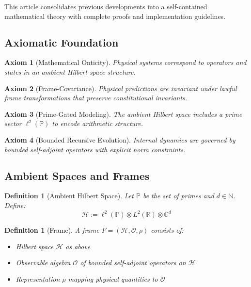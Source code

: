 \documentclass[10pt]{article}
\newtheorem{axiom}{Axiom}
\newtheorem{definition}[theorem]{Definition}
\newcommand{\PP}{\mathbb{P}}
\newcommand{\RR}{\mathbb{R}}
\newcommand{\CC}{\mathbb{C}}
\newcommand{\HH}{\mathcal{H}}
\begin{document}
This article consolidates previous developments into a self-contained mathematical theory with complete proofs and implementation guidelines.

\subsection{Axiomatic Foundation}

\begin{axiom}[Mathematical Onticity]
Physical systems correspond to operators and states in an ambient Hilbert space structure.
\end{axiom}

\begin{axiom}[Frame-Covariance] 
Physical predictions are invariant under lawful frame transformations that preserve constitutional invariants.
\end{axiom}

\begin{axiom}[Prime-Gated Modeling]
The ambient Hilbert space includes a prime sector $\ell^2(\mathbb{P})$ to encode arithmetic structure.
\end{axiom}

\begin{axiom}[Bounded Recursive Evolution]
Internal dynamics are governed by bounded self-adjoint operators with explicit norm constraints.
\end{axiom}

\subsection{Ambient Spaces and Frames}

\begin{definition}[Ambient Hilbert Space]
Let $\PP$ be the set of primes and $d \in \mathbb{N}$. Define:
\[
\HH := \ell^2(\PP) \otimes L^2(\RR) \otimes \CC^d
\]
\end{definition}

\begin{definition}[Frame]
A \emph{frame} $F = (\HH, \mathcal{O}, \rho)$ consists of:
\begin{itemize}
    \item Hilbert space $\HH$ as above
    \item Observable algebra $\mathcal{O}$ of bounded self-adjoint operators on $\HH$  
    \item Representation $\rho$ mapping physical quantities to $\mathcal{O}$
\end{itemize}
\end{definition}
\end{document}
